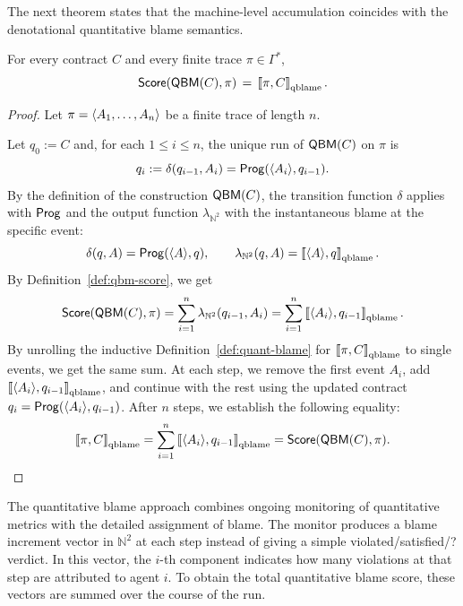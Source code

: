             The next theorem states that the machine-level accumulation coincides with the denotational quantitative blame semantics.
            
            \begin{theorem}
            \label{thm:qbm-conformance}
            For every \cDL contract $C$ and every finite trace $\pi\in\Gamma^*$,
            \[
            \mathsf{Score}(\mathsf{QBM}(C),\pi) \,=\, \left\llbracket \pi,C \right\rrbracket_{\text{qblame}}.
            \]
            \end{theorem}
            
            \begin{proof}
            Let $\pi = \langle A_1,\dots,A_{n} \rangle $ be a finite trace of length $n$.

            Let $q_0 := C$ and, for each $1 \le i \le n$, the unique run of $\mathsf{QBM}(C)$ on $\pi$ is
            \[
              q_{i} := \delta(q_{i-1},A_i) = \mathsf{Prog}(\langle A_i \rangle ,q_{i-1}).
            \]
            By the definition of the construction $\mathsf{QBM}(C)$, the transition function $\delta$ applies with $\mathsf{Prog}$ and the output function $\lambda_{\mathbb{N}^2}$ with the instantaneous blame at the specific event:
            \[
              \delta(q,A) = \mathsf{Prog}(\langle A \rangle ,q), \qquad \lambda_{\mathbb{N}^2}(q,A) = \left\llbracket \langle A \rangle ,q \right\rrbracket_{\text{qblame}}.
            \]
            By Definition~\ref{def:qbm-score}, we get
            \[
              \mathsf{Score}(\mathsf{QBM}(C),\pi)
              = \sum_{i=1}^{n} \lambda_{\mathbb{N}^2}(q_{i-1},A_i)
              = \sum_{i=1}^{n} \left\llbracket \langle A_i \rangle ,q_{i-1} \right\rrbracket_{\text{qblame}}.
            \]
            By unrolling the inductive Definition~\ref{def:quant-blame} for $\left\llbracket \pi, C \right\rrbracket_{\text{qblame}}$  to single events, we get the same sum. At each step, we remove the first event $A_i$, add $\left\llbracket \langle A_i \rangle , q_{i-1} \right\rrbracket_{\text{qblame}}$, and continue with the rest using the updated contract $q_i = \mathsf{Prog}(\langle A_i \rangle , q_{i-1})$. After $n$ steps, we establish the following equality:
            \[
              \left\llbracket \pi,C \right\rrbracket_{\text{qblame}} = \sum_{i=1}^{n} \left\llbracket \langle A_i \rangle ,q_{i-1} \right\rrbracket_{\text{qblame}} = \mathsf{Score}(\mathsf{QBM}(C),\pi). \qedhere
            \]
            \end{proof}


The quantitative blame approach combines ongoing monitoring of quantitative metrics with the detailed assignment of blame.
The monitor produces a blame increment vector in $\mathbb{N}^2$ at each step instead of giving a simple violated/satisfied/? verdict. In this vector, the $i$-th component indicates how many violations at that step are attributed to agent $i$.
To obtain the total quantitative blame score, these vectors are summed over the course of the run.

